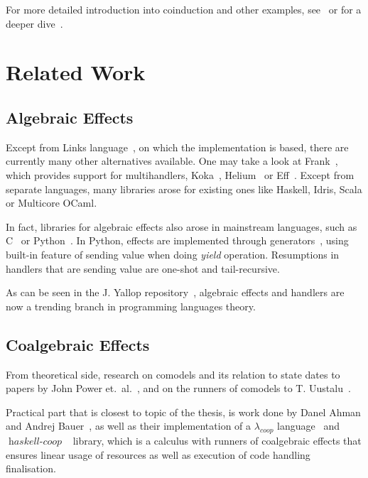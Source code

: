 \documentclass[declaration,shortabstract]{iithesis}
\theoremstyle{definition} \newtheorem{definition}{Definition}[chapter]
\theoremstyle{remark} \newtheorem{remark}[definition]{Observation}
\theoremstyle{plain} \newtheorem{theorem}[definition]{Theorem}
\theoremstyle{plain} \newtheorem{lemma}[definition]{Lemma}
\newcommand{\mathVar}[1]{{\operatorname{\mathit{#1}}}}
\begin{document}
    \noindent
    For more detailed introduction into coinduction and other examples,
    see~\cite{jacobs-rutten, sangiorgi-intro} or for a deeper
    dive~\cite{sangiorgi-advanced}.

\section{Related Work}
    \subsection{Algebraic Effects}

    Except from Links language~\cite{handlers-cps}, on which the implementation
    is based, there are currently many other alternatives available. One may take
    a look at Frank~\cite{frank}, which provides support for multihandlers,
    Koka~\cite{leijen-koka}, Helium~\cite{helium} or Eff~\cite{eff}. Except from
    separate languages, many libraries arose for existing ones like Haskell,
    Idris, Scala or Multicore OCaml.

    In fact, libraries for algebraic effects also arose in mainstream languages,
    such as C~\cite{leijen-c} or Python~\cite{python-effect}. In Python,
    effects are implemented through generators~\cite{one-shot}, using built-in
    feature of sending value when doing \textit{yield} operation. Resumptions in
    handlers that are sending value are one-shot and tail-recursive.

    As can be seen in the J. Yallop repository~\cite{effects-bibliography}, algebraic
    effects and handlers are now a trending branch in programming languages theory.

    \subsection{Coalgebraic Effects}

    From theoretical side, research on comodels and its relation to state
    dates to papers by John Power et.\ al.~\cite{comodels, tensors}, and on
    the runners of comodels to T. Uustalu~\cite{runners-uustalu}.

    Practical part that is closest to topic of the thesis, is work done by
    Danel Ahman and Andrej Bauer~\cite{runners-in-action}, as well as their
    implementation of a $\lambda_{coop}$ language~\cite{coop} and
    $\mathVar{haskell-coop}$~\cite{haskell-coop} library, which is a
    calculus with runners of coalgebraic effects that ensures linear usage of
    resources as well as execution of code handling finalisation.
\end{document}
